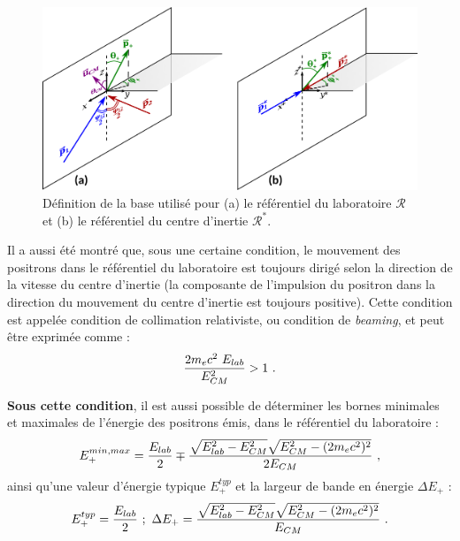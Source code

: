 \begin{refsection}
\begin{figure}[hbtp]
	\centering
	\includegraphics[width=\linewidth]{5-opti_theorique/base_definition.png}
	\caption{Définition de la base utilisé pour (a) le référentiel du laboratoire $\mathcal{R}$ et (b) le référentiel du centre d'inertie $\mathcal{R}^*$.}
	\label{fig:54-base_definition}
\end{figure}

Il a aussi été montré \parencite{ribeyre_2017} que, sous une certaine condition, le mouvement des positrons dans le référentiel du laboratoire est toujours dirigé selon la direction de la vitesse du centre d'inertie (la composante de l'impulsion du positron dans la direction du mouvement du centre d'inertie est toujours positive). Cette condition est appelée condition de collimation relativiste, ou condition de \textit{beaming}, et peut être exprimée comme :
\begin{equation}
    \dfrac{2 m_e c^2 ~ E_{lab}}{E_{CM}^2} > 1 ~ \rm .
    \label{eq:54-beaming_condition}
\end{equation}

\textbf{Sous cette condition}, il est aussi possible \parencite{ribeyre_2017} de déterminer les bornes minimales et maximales de l'énergie des positrons émis, dans le référentiel du laboratoire :
\begin{equation}
    E_+^{min,max}   = \dfrac{E_{lab}}{2} \mp \dfrac{\sqrt{E_{lab}^2 - E_{CM}^2} \sqrt{E_{CM}^2 - (2 m_e c^2)^2}}{2 E_{CM}} ~ \rm ,
    \label{eq:54-E+_min_max}
\end{equation}
ainsi qu'une valeur d'énergie typique $E_+^{typ}$ et la largeur de bande en énergie $\Delta E_+$ :
\begin{equation}
    E_+^{typ} = \dfrac{E_{lab}}{2} ~ ; ~
    \Delta E_+ = \dfrac{\sqrt{E_{lab}^2 - E_{CM}^2} \sqrt{E_{CM}^2 - (2 m_e c^2)^2}}{E_{CM}} ~ \rm .
    \label{eq:54-E+_typ}
\end{equation}


\end{refsection}

